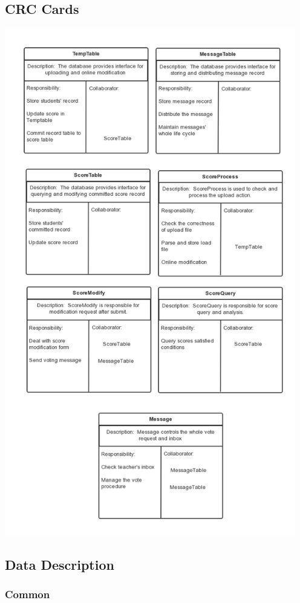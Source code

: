 \documentclass[a4]{article}
\begin{document}
\subsection{CRC Cards}
\includegraphics[width=5in]{pic/5.png}
\subsection{Data Description}
\subsubsection{Common}
\end{document}
